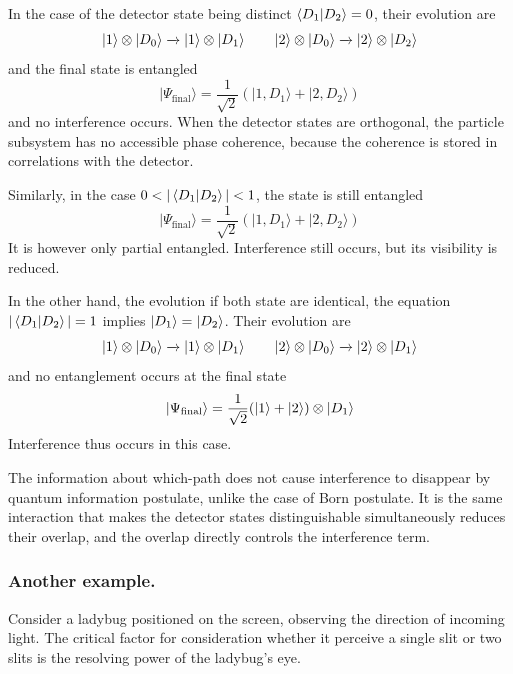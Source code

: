 \documentclass[../../../main.tex]{subfiles}
\begin{document}
In the case of the detector state being distinct $\braket{D_1 |D_2 }=0$, their evolution are
\begin{equation*}
  \ket{1} \otimes |D_0\rangle \xrightarrow{} \ket{1} \otimes |D_1\rangle
  \qquad
  \ket{2} \otimes |D_0\rangle \xrightarrow{} \ket{2} \otimes |D_2\rangle
\end{equation*}
and the final state is entangled
\begin{equation*}
  |\Psi_{\text{final}}\rangle =
  \frac{1}{\sqrt{2}} (|1,D_1\rangle + |2,D_2\rangle)
\end{equation*}
and no interference occurs.
When the detector states are orthogonal, the particle subsystem has no accessible phase coherence, because the coherence is stored in correlations with the detector.

Similarly, in the case $  0<|\braket{D_1  | D_2}|<1 $, the state is still entangled
\begin{equation*}
  |\Psi_{\text{final}}\rangle =
  \frac{1}{\sqrt{2}} (|1,D_1\rangle + |2,D_2\rangle)
\end{equation*}
It is however only partial entangled.
Interference still occurs, but its visibility is reduced.

In the other hand, the evolution if both state are identical, the equation$  |\braket{D_1  | D_2}|=1$ implies $\ket{D_1 }=\ket{D_2}$.
Their evolution are
\begin{equation*}
  \ket{1} \otimes |D_0\rangle \xrightarrow{} \ket{1} \otimes |D_1\rangle
  \qquad
  \ket{2} \otimes |D_0\rangle \xrightarrow{} \ket{2} \otimes |D_1\rangle
\end{equation*}
and no entanglement occurs at the final state
\begin{equation*}
  |\Psi_{\text{final}}\rangle =
  \frac{1}{\sqrt{2}} (\ket{1} + \ket{2}) \otimes \ket{D_1}
\end{equation*}
Interference thus occurs in this case.

The information about which-path does not cause interference to disappear by quantum information postulate, unlike the case of Born postulate.
It is the same interaction that makes the detector states distinguishable simultaneously reduces their overlap, and the overlap directly controls the interference term.

\subsubsection{Another example.}
Consider a ladybug positioned on the screen, observing the direction of incoming light.
The critical factor for consideration whether it perceive a single slit or two slits is the resolving power of the ladybug's eye.
\end{document}
